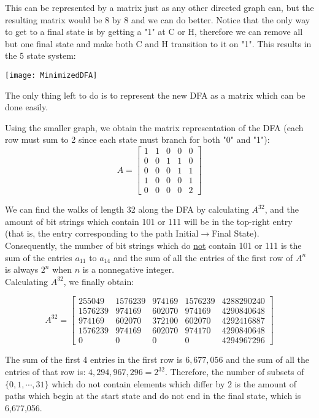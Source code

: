\documentclass[]{article}
\begin{document}
This can be represented by a matrix just as any other directed graph can, but the resulting matrix would be 8 by 8 and we can do better. Notice that the only way to get to a final state is by getting a "1" at C or H, therefore we can remove all but one final state and make both C and H transition to it on "1". This results in the 5 state system:

\begin{center}
\texttt{[image: MinimizedDFA]}
\end{center}
The only thing left to do is to represent the new DFA as a matrix which can be done easily.

\pagebreak
Using the smaller graph, we obtain the matrix representation of the DFA (each row must sum to 2 since each state must branch for both "0" and "1"):
$$A = \begin{bmatrix}
1 & 1 & 0 & 0 & 0 \\ 
0 & 0 & 1 & 1 & 0 \\ 
0 & 0 & 0 & 1 & 1 \\ 
1 & 0 & 0 & 0 & 1 \\ 
0 & 0 & 0 & 0 & 2
\end{bmatrix} $$

We can find the walks of length 32 along the DFA by calculating $A^{32}$, and the amount of bit strings which contain 101 or 111 will be in the top-right entry (that is, the entry corresponding to the path Initial$\rightarrow$Final State). Consequently, the number of bit strings which do \underline{not} contain 101 or 111 is the sum of the entries $a_{11}$ to $a_{14}$ and the sum of all the entries of the first row of $A^n$ is always $2^{n}$ when $n$ is a nonnegative integer.\\

Calculating $A^{32}$, we finally obtain:

$$A^{32} = \begin{bmatrix}
255049 & 1576239 & 974169 & 1576239 & 4288290240 \\ 
1576239 & 974169 & 602070 & 974169 & 4290840648 \\ 
974169 & 602070 & 372100 & 602070 & 4292416887 \\ 
1576239 & 974169 & 602070 & 974170 & 4290840648 \\ 
0 & 0 & 0 & 0 & 4294967296
\end{bmatrix} $$

The sum of the first 4 entries in the first row is $6,677,056$ and the sum of all the entries of that row is: $4,294,967,296 = 2^{32}$. Therefore, the number of subsets of $\{0, 1, \cdots, 31\}$ which do not contain elements which differ by 2 is the amount of paths which begin at the start state and do not end in the final state, which is 6,677,056.
\end{document}
